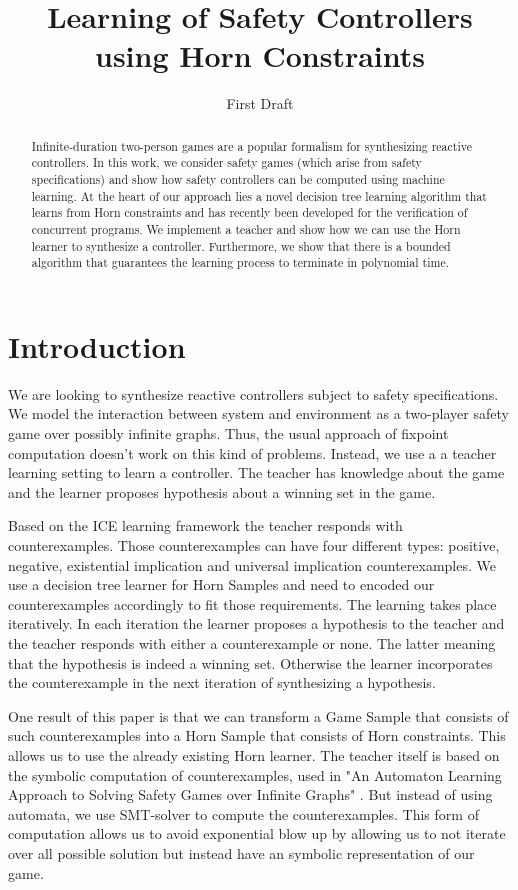 \documentclass[10pt,a4paper]{article}
\author{First Draft}
\title{Learning of Safety Controllers using Horn Constraints}
\theoremstyle{plain}
\theoremstyle{definition}
\begin{document}
\maketitle
\begin{abstract}
Infinite-duration two-person games are a popular formalism for synthesizing reactive controllers. In this work, we consider safety games (which arise from safety specifications) and show how safety controllers can be computed using machine learning. At the heart of our approach lies a novel decision tree learning algorithm that learns from Horn constraints and has recently been developed for the verification of concurrent programs. We implement a teacher and show how we can use the Horn learner to synthesize a controller. Furthermore, we show that there is a bounded algorithm that guarantees the learning process to terminate in polynomial time.
\end{abstract}

\section{Introduction}

We are looking to synthesize reactive controllers subject to safety specifications. We model the interaction between system and environment as a two-player safety game over possibly infinite graphs. Thus, the usual approach of fixpoint computation doesn't work on this kind of problems. Instead, we use a a teacher learning setting to learn a controller. The teacher has knowledge about the game and the learner proposes hypothesis about a winning set in the game. 

Based on the ICE learning framework the teacher responds with counterexamples. Those counterexamples can have four different types: positive, negative, existential implication and universal implication counterexamples. We use a decision tree learner for Horn Samples and need to encoded our counterexamples accordingly to fit those requirements. The learning takes place iteratively. In each iteration the learner proposes a hypothesis to the teacher and the teacher responds with either a counterexample or none. The latter meaning that the hypothesis is indeed a winning set. Otherwise the learner incorporates the counterexample in the next iteration of synthesizing a hypothesis.  

One result of this paper is that we can transform a Game Sample that consists of such counterexamples into a Horn Sample that consists of Horn constraints. This allows us to use the already existing Horn learner\cite{d2017horn}. The teacher itself is based on the symbolic computation of counterexamples, used in "An Automaton Learning Approach to Solving Safety Games over Infinite Graphs" \cite{neider2016automaton}. But instead of using automata, we use SMT-solver to compute the counterexamples. This form of computation allows us to avoid exponential blow up by allowing us to not iterate over all possible solution but instead have an symbolic representation of our game.
\end{document}
